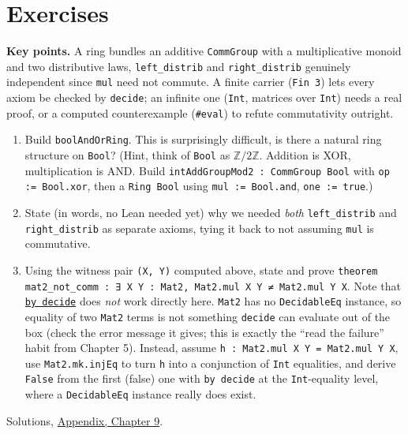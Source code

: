 \section{Exercises}\label{sec:09-rings:08-exercises:1}

\textbf{Key points.} A ring bundles an additive \texttt{CommGroup} with a multiplicative monoid and two distributive laws, \texttt{left\_\allowbreak{}distrib} and \texttt{right\_\allowbreak{}distrib} genuinely independent since \texttt{mul} need not commute. A finite carrier (\texttt{Fin 3}) lets every axiom be checked by \texttt{decide}; an infinite one (\texttt{Int}, matrices over \texttt{Int}) needs a real proof, or a computed counterexample (\texttt{\#eval}) to refute commutativity outright.

\begin{enumerate}
\def\labelenumi{\arabic{enumi}.}
\tightlist
\item
  Build \texttt{boolAndOrRing}. This is surprisingly difficult, is there a natural ring structure on \texttt{Bool}? (Hint, think of \texttt{Bool} as \(\mathbb{Z}/2\mathbb{Z}\). Addition is XOR, multiplication is AND. Build \texttt{intAddGroupMod2 : CommGroup Bool} with \texttt{op := Bool.xor}, then a \texttt{Ring Bool} using \texttt{mul := Bool.and}, \texttt{one := true}.)
\item
  State (in words, no Lean needed yet) why we needed \emph{both} \texttt{left\_\allowbreak{}distrib} and \texttt{right\_\allowbreak{}distrib} as separate axioms, tying it back to not assuming \texttt{mul} is commutative.
\item
  Using the witness pair \texttt{(X, Y)} computed above, state and prove \texttt{theorem mat2\_\allowbreak{}not\_\allowbreak{}comm : ∃ X Y : Mat2, Mat2.mul X Y ≠ Mat2.mul Y X}. Note that \href{https://lean-lang.org/doc/reference/latest/Tactic-Proofs/Tactic-Reference/}{\texttt{by decide}} does \emph{not} work directly here. \texttt{Mat2} has no \texttt{DecidableEq} instance, so equality of two \texttt{Mat2} terms is not something \texttt{decide} can evaluate out of the box (check the error message it gives; this is exactly the ``read the failure'' habit from Chapter 5). Instead, assume \texttt{h : Mat2.mul X Y = Mat2.mul Y X}, use \texttt{Mat2.mk.injEq} to turn \texttt{h} into a conjunction of \texttt{Int} equalities, and derive \texttt{False} from the first (false) one with \texttt{by decide} at the \texttt{Int}-equality level, where a \texttt{DecidableEq} instance really does exist.
\end{enumerate}

Solutions, \hyperref[sec:15-appendix-solutions:09-chapter-9:1]{Appendix, Chapter 9}.

